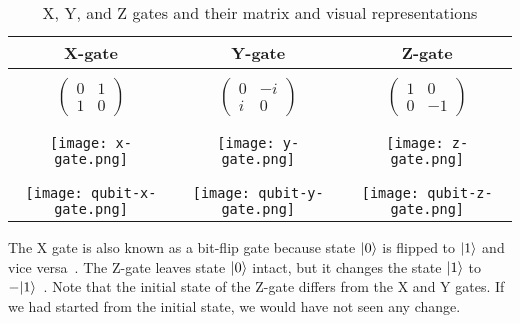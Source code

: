 \begin{table}[H]
  \centering
  \caption{X, Y, and Z gates and their matrix and visual representations}
  \begin{tabular}{|c|c|c|} 
      \hline
      \textbf{X-gate} & \textbf{Y-gate} & \textbf{Z-gate}\\
      \hline
      &&\\[0.5pt]
      $\begin{pmatrix}
        0 & 1 \\
        1 & 0
      \end{pmatrix}$ & 
      $\begin{pmatrix}
        0 & -i \\
        i & 0
      \end{pmatrix}$ &
      $\begin{pmatrix}
        1 & 0 \\
        0 & -1
      \end{pmatrix}$\\
      &&\\[0.5pt]
      \hline
      &&\\[0.5pt]
      \texttt{[image: x-gate.png]} & \texttt{[image: y-gate.png]}  & \texttt{[image: z-gate.png]}\\
      &&\\[0.5pt]
      \hline
      &&\\[0.5pt]
      \texttt{[image: qubit-x-gate.png]} & \texttt{[image: qubit-y-gate.png]} & \texttt{[image: qubit-z-gate.png]}\\
      \hline
  \end{tabular}
  \label{tab:xyz-gates}
\end{table}

The X gate is also known as a bit-flip gate because state $\lvert0\rangle$ is flipped to $\lvert1\rangle$ and vice versa~\cite{qc}. The Z-gate leaves state $\lvert0\rangle$ intact, but it changes the state $\lvert1\rangle$ to $-\lvert1\rangle$~\cite{qc}. Note that the initial state of the Z-gate differs from the X and Y gates. If we had started from the initial state, we would have not seen any change.


